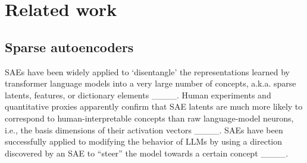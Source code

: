 \section{Related work}

\subsection{Sparse autoencoders}

SAEs have been widely applied to `disentangle' the representations learned by transformer language models into a very large number of concepts, a.k.a. sparse latents, features, or dictionary elements
____.
Human experiments and quantitative proxies apparently confirm that SAE latents are much more likely to correspond to human-interpretable concepts than raw language-model neurons, i.e., the basis dimensions of their activation vectors ____.
SAEs have been successfully applied to modifying the behavior of LLMs by using a direction discovered by an SAE to ``steer'' the model towards a certain concept ____.



